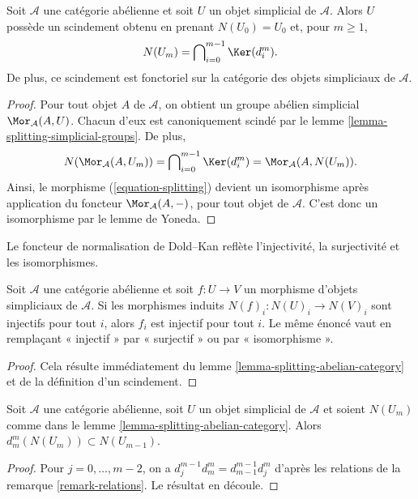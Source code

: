 \begin{lemma}
\label{lemma-splitting-abelian-category}
Soit $\mathcal{A}$ une catégorie abélienne et soit $U$ un objet
simplicial de $\mathcal{A}$. Alors $U$ possède un scindement obtenu en
prenant $N(U_0) = U_0$ et, pour $m \geq 1$,
$$
N(U_m) = \bigcap\nolimits_{i = 0}^{m - 1} \Ker(d^m_i).
$$
De plus, ce scindement est fonctoriel sur la catégorie des objets
simpliciaux de $\mathcal{A}$.
\end{lemma}

\begin{proof}
Pour tout objet $A$ de $\mathcal{A}$, on obtient un groupe abélien
simplicial $\Mor_\mathcal{A}(A, U)$. Chacun d'eux est canoniquement
scindé par le lemme \ref{lemma-splitting-simplicial-groups}. De plus,
$$
N(\Mor_\mathcal{A}(A, U_m)) =
\bigcap\nolimits_{i = 0}^{m - 1} \Ker(d^m_i) =
\Mor_\mathcal{A}(A, N(U_m)).
$$
Ainsi, le morphisme (\ref{equation-splitting}) devient un isomorphisme
après application du foncteur $\Mor_\mathcal{A}(A, -)$, pour tout objet
de $\mathcal{A}$. C'est donc un isomorphisme par le lemme de Yoneda.
\end{proof}

\begin{lemma}
\label{lemma-injective-map-simplicial-abelian}
\begin{slogan}
Le foncteur de normalisation de Dold--Kan reflète
l'injectivité, la surjectivité et les isomorphismes.
\end{slogan}
Soit $\mathcal{A}$ une catégorie abélienne et soit $f : U \to V$ un
morphisme d'objets simpliciaux de $\mathcal{A}$. Si les morphismes
induits $N(f)_i : N(U)_i \to N(V)_i$ sont injectifs pour tout $i$,
alors $f_i$ est injectif pour tout $i$. Le même énoncé vaut en remplaçant
« injectif » par « surjectif » ou par « isomorphisme ».
\end{lemma}

\begin{proof}
Cela résulte immédiatement du lemme
\ref{lemma-splitting-abelian-category} et de la définition d'un scindement.
\end{proof}


\begin{lemma}
\label{lemma-N-d-in-N}
Soit $\mathcal{A}$ une catégorie abélienne, soit $U$ un objet simplicial
de $\mathcal{A}$ et soient $N(U_m)$ comme dans le lemme
\ref{lemma-splitting-abelian-category}. Alors
$d^m_m(N(U_m)) \subset N(U_{m - 1})$.
\end{lemma}

\begin{proof}
Pour $j = 0, \ldots, m - 2$, on a
$d^{m - 1}_j d^m_m = d^{m - 1}_{m - 1} d^m_j$
d'après les relations de la remarque \ref{remark-relations}.
Le résultat en découle.
\end{proof}

